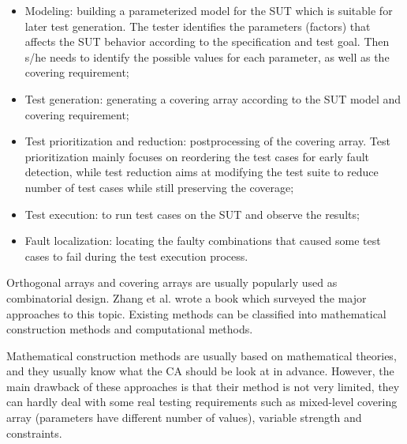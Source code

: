 \documentclass[10pt,conference, compsocconf]{IEEEtran}
\begin{document}
\begin{CJK}{UTF8}{gkai}
\begin{itemize}
\item Modeling: building a parameterized model for the SUT which is suitable for
later test generation. The tester identifies the parameters (factors) that
affects the SUT behavior according to the specification and test goal. Then s/he
needs to identify the possible values for each parameter, as well as the
covering requirement;

\item Test generation: generating a covering array according to the SUT model
and covering requirement;

\item Test prioritization and reduction: postprocessing of the covering array.
Test prioritization mainly focuses on reordering the test cases for early fault
detection, while test reduction aims at modifying the test suite to reduce
number of test cases while still preserving the coverage;

\item Test execution: to run test cases on the SUT and observe the results;

\item Fault localization: locating the faulty combinations that caused some test
cases to fail during the test execution process.
\end{itemize}

Orthogonal arrays and covering arrays are usually popularly used 
as combinatorial design\cite{Mats2005testing}.
Zhang et al. \cite{zhang14book} wrote
a book which surveyed the major approaches to this topic. Existing methods can
be classified into mathematical construction methods and computational methods.

Mathematical construction methods are usually based on mathematical theories,
and they usually know what the CA should be look at in advance.
However, the main drawback of these approaches is that their method is
not very limited, they can hardly deal with some real testing requirements such
as mixed-level covering array (parameters have different number of values),
variable strength and constraints.


\end{CJK}
\end{document}

